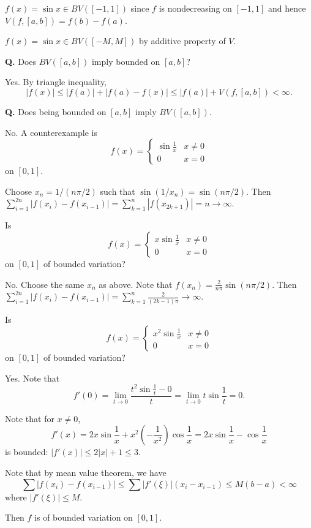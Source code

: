 \documentclass{notes}
\begin{document}
\begin{eg}
  $f(x) = \sin x \in BV([-1, 1])$ since $f$ is nondecreasing on $[-1, 1]$ and hence $V(f, [a, b]) = f(b) - f(a)$.
\end{eg}

\begin{eg}
  $f(x) = \sin x \in BV([-M, M])$ by additive property of $V$.
\end{eg}

{\boldmath \bfseries Q.} Does $BV([a, b])$ imply bounded on $[a, b]$?

Yes.
By triangle inequality, 
\[
  \left | f(x) \right | \leq \left | f(a) \right | + \left | f(a) - f(x) \right | \leq \left | f(a) \right | + V(f, [a, b]) < \infty.
\]

{\boldmath \bfseries Q.} Does being bounded on $[a, b]$ imply $BV([a, b])$.

No.
A counterexample is 
\[
  f(x) = \begin{cases}
    \sin \frac{1}{x} & x \neq 0 \\ 
    0 & x = 0
  \end{cases}
\]
on $[0, 1]$.

Choose $x_n = 1 / (n \pi / 2)$ such that $\sin(1 / x_n) = \sin(n \pi / 2)$.
Then $\sum_{i = 1}^{2 n} \left | f(x_i) - f(x_{i - 1}) \right | = \sum_{k = 1}^n \left | f(x_{2 k + 1}) \right | = n \to \infty$.

\begin{eg}
  Is 
  \[
    f(x) = \begin{cases}
      x \sin \frac{1}{x} & x \neq 0 \\ 
      0 & x = 0
    \end{cases}
  \]
  on $[0, 1]$ of bounded variation?
  
  No.
  Choose the same $x_n$ as above.
  Note that $f(x_n) = \frac{2}{n \pi} \sin(n \pi / 2)$.
  Then $\sum_{i = 1}^{2 n} \left | f(x_i) - f(x_{i - 1}) \right | = \sum_{k = 1}^n \frac{2}{(2 k - 1) \pi} \to \infty$.
\end{eg}

\begin{eg}
  Is 
  \[
    f(x) = \begin{cases}
      x^2 \sin \frac{1}{x} & x \neq 0 \\ 
      0 & x = 0
    \end{cases}
  \]
  on $[0, 1]$ of bounded variation?
  
  Yes.
  Note that 
  \[
    f'(0) = \lim_{t \to 0} \frac{t^2 \sin \frac{1}{t} - 0}{t} = \lim_{t \to 0} t \sin \frac{1}{t} = 0.
  \]
  
  Note that for $x \neq 0$, 
  \[
    f'(x) = 2 x \sin \frac{1}{x} + x^2 \left ( -\frac{1}{x^2} \right ) \cos \frac{1}{x} = 2 x \sin \frac{1}{x} - \cos \frac{1}{x}
  \]
  is bounded: $\left | f'(x) \right | \leq 2 \left | x \right | + 1 \leq 3$.

  Note that by mean value theorem, we have 
  \[
    \sum \left | f(x_i) - f(x_{i - 1}) \right | \leq \sum \left | f'(\xi) \right | (x_i - x_{i - 1}) \leq M (b - a) < \infty
  \]
  where $\left | f'(\xi) \right | \leq M$.

  Then $f$ is of bounded variation on $[0, 1]$.
\end{eg}
\end{document}
